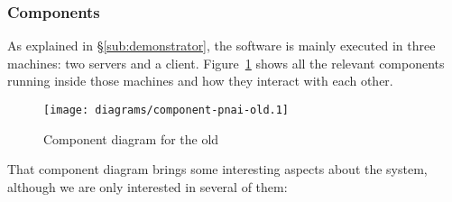 \subsubsection{Components} %
\label{ssub:componentsold}

As explained in \S\ref{sub:demonstrator}, the software is mainly executed in three machines: two servers and a client.
Figure~\ref{fig:componentdiagramsold} shows all the relevant components running inside those machines and how they interact with each other.

\begin{figure}[htbp]
  \centering
    \texttt{[image: diagrams/component-pnai-old.1]}
  \caption{Component diagram for the old }
  \label{fig:componentdiagramsold}
\end{figure}

That component diagram brings some interesting aspects about the system, although we are only interested in several of them:

